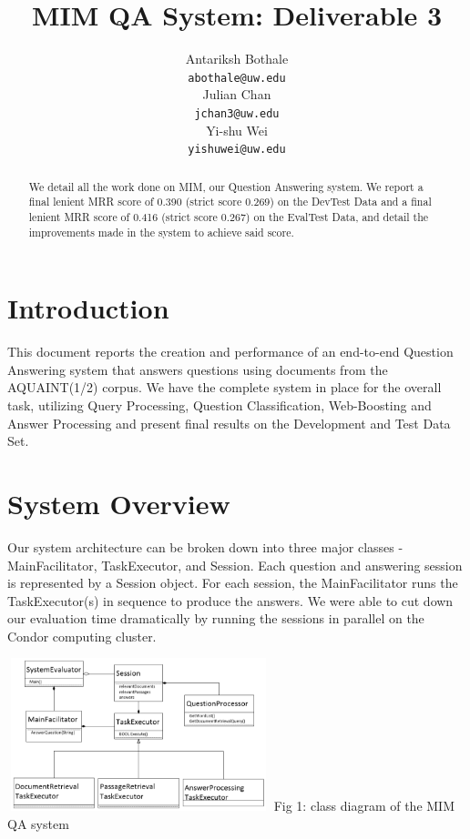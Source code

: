 \documentclass[11pt]{article}
\title{MIM QA System: Deliverable 3}
\author{Antariksh Bothale \\
  {\tt abothale@uw.edu} \\\And
  Julian Chan\\
  {\tt jchan3@uw.edu} \\\And
  Yi-shu Wei\\
  {\tt yishuwei@uw.edu}}
\date{}
\begin{document}
\maketitle
\begin{abstract}
We detail all the work done on MIM, our Question Answering system. We report a final lenient MRR score of 0.390 (strict score 0.269) on the DevTest Data and a final lenient MRR score of 0.416 (strict score 0.267) on the EvalTest Data, and detail the improvements made in the system to achieve said score.
\end{abstract}

\section{Introduction}
This document reports the creation and performance of an end-to-end Question Answering system that answers questions using documents from the AQUAINT(1/2) corpus. We have the complete system in place for the overall task, utilizing Query Processing, Question Classification, Web-Boosting and Answer Processing and present final results on the Development and Test Data Set. 

\section{System Overview}

Our system architecture can be broken down into three major classes - MainFacilitator, TaskExecutor, and Session. Each question and answering session is represented by a Session object. For each session, the MainFacilitator runs the TaskExecutor(s) in sequence to produce the answers. We were able to cut down our evaluation time dramatically by running the sessions in parallel on the Condor computing cluster. 

\includegraphics[width=3in,height=1.75in]{MIM_class_diagram.png}
Fig 1: class diagram of the MIM QA system
\end{document}

